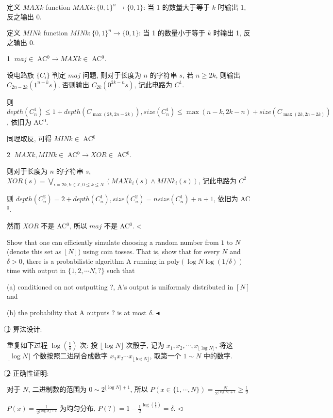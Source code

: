 \documentclass[11pt]{article}
\newenvironment{problem}[2][Problem]{\begin{trivlist}
		\item[\hskip \labelsep {\bfseries #1}\hskip \labelsep {\bfseries #2.}]}{\hfill$\blacktriangleleft$\end{trivlist}}
\newenvironment{answer}[1][Answer]{\begin{trivlist}
		\item[\hskip \labelsep {\bfseries #1.}\hskip \labelsep]}{\hfill$\lhd$\end{trivlist}}
\begin{document}
	\begin{answer}
		定义 $MAXk$ function $MAXk:\{0,1\}^n\rightarrow\{0,1\}$: 当 1 的数量大于等于 $k$ 时输出 1, 反之输出 0.
		
		定义 $MINk$ function $MINk:\{0,1\}^n\rightarrow\{0,1\}$: 当 1 的数量小于等于 $k$ 时输出 1, 反之输出 0.
		
		\textcircled{1} $maj\in$ AC$^0\rightarrow MAXk\in$ AC$^0$.
		
		设电路族 $\{C_i\}$ 判定 $maj$ 问题, 则对于长度为 $n$ 的字符串 $s$, 若 $n\geq 2k$, 则输出 $C_{2n-2k}(1^{n-k}s)$, 否则输出 $C_{2k}(0^{2k-n}s)$, 记此电路为 $C^1$.
		
		则 $depth(C^1_n)\leq1+depth(C_{\max(2k,2n-2k)}),size(C^1_n)\leq\max(n-k,2k-n)+size(C_{\max(2k,2n-2k)})$, 依旧为 AC$^0$.
		
		同理取反, 可得 $MINk\in$ AC$^0$
		
		\textcircled{2} $MAXk,MINk\in$ AC$^0\rightarrow XOR\in$ AC$^0$.
		
		则对于长度为 $n$ 的字符串 $s$, $XOR(s)=\bigvee\limits_{i=2k,k\in\mathbb{Z},0\leq k\leq N}(MAXk_{i}(s)\wedge MINk_{i}(s))$, 记此电路为 $C^2$
		
		则 $depth(C^2_n)=2+depth(C^1_n),size(C^2_n)=nsize(C^1_n)+n+1$, 依旧为 AC$^0$.
		
		然而 $XOR$ 不是 AC$^0$, 所以 $maj$ 不是 AC$^0$.
	\end{answer}
	\begin{problem}{3.(20分)}
		Show that one can efficiently simulate choosing a random number from $1$ to $N$ (denote this set as $[N]$) using coin tosses. That is, show that for every $N$ and $\delta > 0$, there is a probabilistic algorithm A running in poly$(\log N \log(1/\delta))$ time with output in $\{1, 2,\cdots N, ?\}$ such that
		
		(a) conditioned on not outputting ?, A’s output is uniformaly distributed in $[N]$ and
		
		(b) the probability that A outputs ? is at most $\delta$.
	\end{problem}
	\begin{answer}
		\textcircled{1} 算法设计:
		
		重复如下过程 $\log(\frac{1}{\delta})$ 次: 投 $\lfloor\log N\rfloor$ 次骰子, 记为 $x_1,x_2,\cdots,x_{\lfloor\log N\rfloor}$, 将这 $\lfloor\log N\rfloor$ 个数按照二进制合成数字 $x_1x_2\cdots x_{\lfloor\log N\rfloor}$, 取第一个 $1\sim N$ 中的数字.
		
		\textcircled{2} 正确性证明:
		
		对于 $N$, 二进制数的范围为 $0\sim 2^{\lfloor\log N\rfloor+1}$, 所以 $P(x\in\{1,\cdots,N\})=\frac{N}{2^{\lfloor\log N\rfloor+1}}\geq\frac{1}{2}$
		
		$P(x)=\frac{1}{2^{\lfloor\log N\rfloor+1}}$ 为均匀分布, $P(?)=1-\frac{1}{2}^{\log(\frac{1}{\delta})}=\delta$.
	\end{answer}
\end{document}
